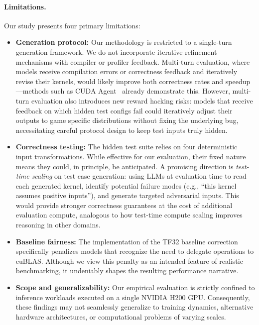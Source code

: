 \documentclass[]{fairmeta}
\begin{document}
\paragraph{Limitations.} Our study presents four primary limitations:
\begin{itemize}
    \item \textbf{Generation protocol:} Our methodology is restricted to a single-turn generation framework. We do not incorporate iterative refinement mechanisms with compiler or profiler feedback. Multi-turn evaluation, where models receive compilation errors or correctness feedback and iteratively revise their kernels, would likely improve both correctness rates and speedup---methods such as CUDA Agent~\citep{DBLP:journals/corr/abs-2602-24286} already demonstrate this. However, multi-turn evaluation also introduces new reward hacking risks: models that receive feedback on which hidden test configs fail could iteratively adjust their outputs to game specific distributions without fixing the underlying bug, necessitating careful protocol design to keep test inputs truly hidden.
    \item \textbf{Correctness testing:} The hidden test suite relies on four deterministic input transformations. While effective for our evaluation, their fixed nature means they could, in principle, be anticipated. A promising direction is \emph{test-time scaling} on test case generation: using LLMs at evaluation time to read each generated kernel, identify potential failure modes (e.g., ``this kernel assumes positive inputs''), and generate targeted adversarial inputs. This would provide stronger correctness guarantees at the cost of additional evaluation compute, analogous to how test-time compute scaling improves reasoning in other domains.
    \item \textbf{Baseline fairness:} The implementation of the TF32 baseline correction specifically penalizes models that recognize the need to delegate operations to cuBLAS. Although we view this penalty as an intended feature of realistic benchmarking, it undeniably shapes the resulting performance narrative.
    \item \textbf{Scope and generalizability:} Our empirical evaluation is strictly confined to inference workloads executed on a single NVIDIA H200 GPU. Consequently, these findings may not seamlessly generalize to training dynamics, alternative hardware architectures, or computational problems of varying scales.
\end{itemize}
\end{document}
